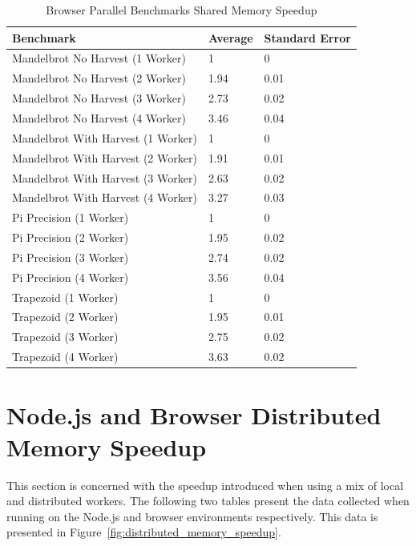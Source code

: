 \documentclass[oneside]{um-fict}
\begin{document}
\begin{table}[H]
    \begin{center}
        \begin{tabular}{|l|ll|}
            \hline
            Benchmark                  & Average & Standard Error \\ \hline
            Mandelbrot No Harvest (1 Worker)   & 1       & 0              \\
            Mandelbrot No Harvest (2 Worker)   & 1.94    & 0.01           \\
            Mandelbrot No Harvest (3 Worker)   & 2.73    & 0.02           \\
            Mandelbrot No Harvest (4 Worker)   & 3.46    & 0.04           \\
            Mandelbrot With Harvest (1 Worker) & 1       & 0              \\
            Mandelbrot With Harvest (2 Worker) & 1.91    & 0.01           \\
            Mandelbrot With Harvest (3 Worker) & 2.63    & 0.02           \\
            Mandelbrot With Harvest (4 Worker) & 3.27    & 0.03           \\
            Pi Precision (1 Worker)            & 1       & 0              \\
            Pi Precision (2 Worker)            & 1.95    & 0.02           \\
            Pi Precision (3 Worker)            & 2.74    & 0.02           \\
            Pi Precision (4 Worker)            & 3.56    & 0.04           \\
            Trapezoid (1 Worker)               & 1       & 0              \\
            Trapezoid (2 Worker)               & 1.95    & 0.01           \\
            Trapezoid (3 Worker)               & 2.75    & 0.02           \\
            Trapezoid (4 Worker)               & 3.63    & 0.02           \\ \hline
        \end{tabular}
        \caption{Browser Parallel Benchmarks Shared Memory Speedup}\label{tab:browsersharedmemoryspeedup}
    \end{center}
\end{table}
\section{Node.js and Browser Distributed Memory Speedup}
This section is concerned with the speedup introduced when using a mix of local and distributed workers. The following two tables present the data collected when running on the Node.js and browser environments respectively. This data is presented in Figure~\ref{fig:distributed_memory_speedup}.
\end{document}
